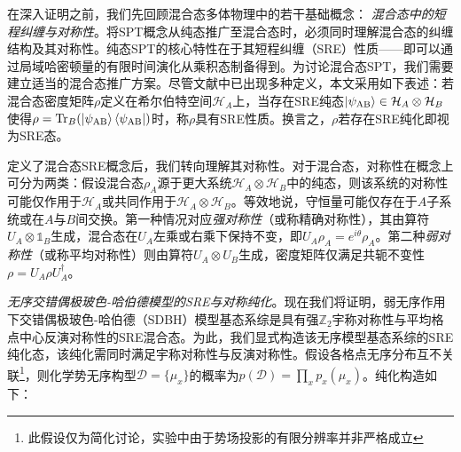 \documentclass[preprint,superscriptaddress,floatfix, nofootinbib]{revtex4-2}
\begin{document}
在深入证明之前，我们先回顾混合态多体物理中的若干基础概念：
\textit{混合态中的短程纠缠与对称性}。将SPT概念从纯态推广至混合态时，必须同时理解混合态的纠缠结构及其对称性。纯态SPT的核心特性在于其短程纠缠（SRE）性质——即可以通过局域哈密顿量的有限时间演化从乘积态制备得到。为讨论混合态SPT，我们需要建立适当的混合态推广方案。尽管文献中已出现多种定义\cite{Ma2023, Chen2024}，本文采用如下表述：若混合态密度矩阵$\rho$定义在希尔伯特空间$\mathcal{H}_A$上，当存在SRE纯态$\ket{\psi_{\text{AB}}} \in \mathcal{H}_A \otimes \mathcal{H}_B$使得$\rho = \text{Tr}_{B}(\ket{\psi_{\text{AB}}} \bra{\psi_{\text{AB}}})$时，称$\rho$具有SRE性质。换言之，$\rho$若存在SRE纯化即视为SRE态。

定义了混合态SRE概念后，我们转向理解其对称性。对于混合态，对称性在概念上可分为两类：假设混合态$\rho_A$源于更大系统$\mathcal{H}_{A} \otimes \mathcal{H}_{B}$中的纯态，则该系统的对称性可能仅作用于$\mathcal{H}_A$或共同作用于$\mathcal{H}_A \otimes \mathcal{H}_B$。等效地说，守恒量可能仅存在于$A$子系统或在$A$与$B$间交换。第一种情况对应\textit{强对称性}（或称精确对称性），其由算符$U_A \otimes \mathds{1}_{B}$生成，混合态在$U_A$左乘或右乘下保持不变，即$U_A \rho_A = e^{i \theta} \rho_A$。第二种\textit{弱对称性}（或称平均对称性）则由算符$U_A \otimes U_B$生成，密度矩阵仅满足共轭不变性$\rho = U_A \rho U_A^{\dagger}$。

\textit{无序交错偶极玻色-哈伯德模型的SRE与对称纯化}。现在我们将证明，弱无序作用下交错偶极玻色-哈伯德（SDBH）模型基态系综是具有强$\mathbb{Z}_2$宇称对称性与平均格点中心反演对称性的SRE混合态。为此，我们显式构造该无序模型基态系综的SRE纯化态，该纯化需同时满足宇称对称性与反演对称性。假设各格点无序分布互不关联\footnote{此假设仅为简化讨论，实验中由于势场投影的有限分辨率并非严格成立}，则化学势无序构型$\mathcal{D} = \{\mu_x\}$的概率为$p(\mathcal{D}) = \prod_{x} p_x(\mu_x)$。纯化构造如下：
\end{document}
